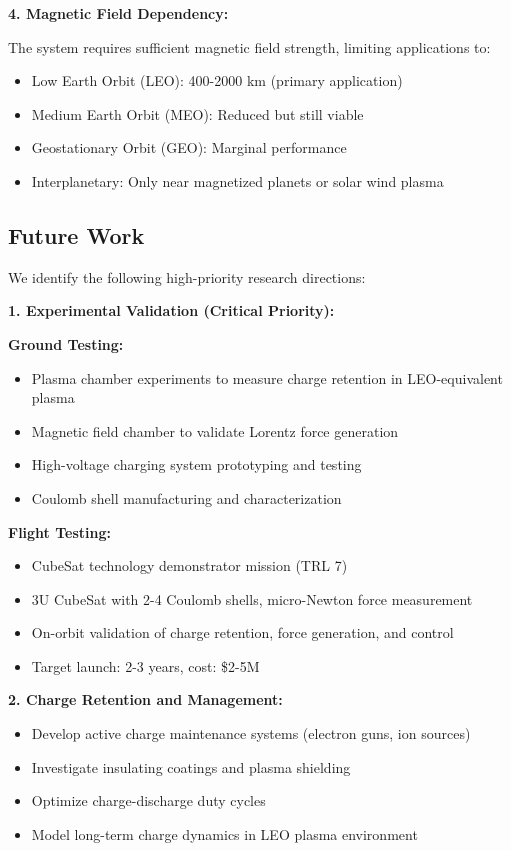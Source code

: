 \documentclass[12pt,a4paper]{article}
\begin{document}
\textbf{4. Magnetic Field Dependency:}

The system requires sufficient magnetic field strength, limiting applications to:
\begin{itemize}
\item Low Earth Orbit (LEO): 400-2000 km (primary application)
\item Medium Earth Orbit (MEO): Reduced but still viable
\item Geostationary Orbit (GEO): Marginal performance
\item Interplanetary: Only near magnetized planets or solar wind plasma
\end{itemize}

\subsection{Future Work}

We identify the following high-priority research directions:

\textbf{1. Experimental Validation (Critical Priority):}

\textbf{Ground Testing:}
\begin{itemize}
\item Plasma chamber experiments to measure charge retention in LEO-equivalent plasma
\item Magnetic field chamber to validate Lorentz force generation
\item High-voltage charging system prototyping and testing
\item Coulomb shell manufacturing and characterization
\end{itemize}

\textbf{Flight Testing:}
\begin{itemize}
\item CubeSat technology demonstrator mission (TRL 7)
\item 3U CubeSat with 2-4 Coulomb shells, micro-Newton force measurement
\item On-orbit validation of charge retention, force generation, and control
\item Target launch: 2-3 years, cost: \$2-5M
\end{itemize}

\textbf{2. Charge Retention and Management:}

\begin{itemize}
\item Develop active charge maintenance systems (electron guns, ion sources)
\item Investigate insulating coatings and plasma shielding
\item Optimize charge-discharge duty cycles
\item Model long-term charge dynamics in LEO plasma environment
\end{itemize}
\end{document}
